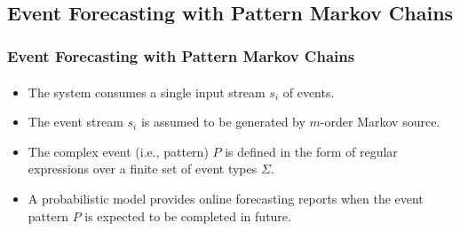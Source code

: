 \subsection{\\ Event Forecasting with Pattern Markov
	Chains\\}
\frame
{
	\frametitle{ Event Forecasting with Pattern Markov
		Chains}
	\framesubtitle{\citep{alevizos2017event}}
	\begin{itemize}[]
		\item<1-> The system consumes a single input stream $s_i$ of events.
		\item<1-> The event stream $s_i$ is assumed to be generated by  $m$-order Markov source.
		\item<1-> The complex event (i.e., pattern) $P$ is defined in the form of regular expressions over a finite set of event types $\Sigma$.
		
		\item<1-> A probabilistic model provides online forecasting reports when the event pattern $P$ is expected to be completed in future. 
		
	\end{itemize}
}


